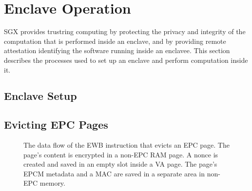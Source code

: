 \section{Enclave Operation}

SGX provides trustring computing by protecting the privacy and integrity of the
computation that is performed inside an enclave, and by providing remote
attestation identifying the software running inside an enclavee. This section
describes the processes used to set up an enclave and perform computation
inside it.

\subsection{Enclave Setup}



\subsection{Evicting EPC Pages}



\begin{figure}[hbt!]
  \caption{
    The data flow of the EWB instruction that evicts an EPC page. The page's
    content is encrypted in a non-EPC RAM page. A nonce is created and saved
    in an empty slot inside a VA page. The page's EPCM metadata and a MAC
    are saved in a separate area in non-EPC memory.
  }
  \label{fig:sgx_ewb}
\end{figure}


